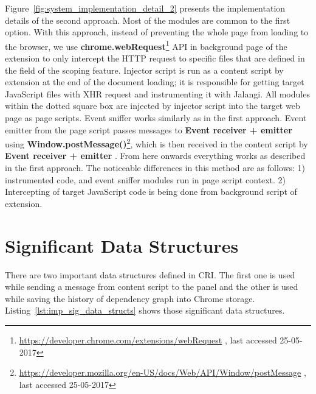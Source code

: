 Figure~\ref{fig:system_implementation_detail_2} presents the implementation details of the second approach. Most of the modules are common to the first option.
With this approach, instead of preventing the whole page from loading to the browser, we use \textbf{chrome.webRequest}\footnote{\url{https://developer.chrome.com/extensions/webRequest} , last accessed 25-05-2017} API in background page of the extension to only intercept the HTTP request to specific files that are defined in the field of the scoping feature.
Injector script is run as a content script by extension at the end of the document loading; it is responsible for getting target JavaScript files with XHR request and instrumenting it with Jalangi. 
All modules within the dotted square box are injected by injector script into the target web page as page scripts. Event sniffer works similarly as in the first approach.
Event emitter from the page script passes messages to \textbf{Event receiver + emitter} using \textbf{Window.postMessage()}\footnote{\url{https://developer.mozilla.org/en-US/docs/Web/API/Window/postMessage} , last accessed 25-05-2017}, which is then received in the content script by \textbf{Event receiver + emitter} .
From here onwards everything works as described in the first approach.
The noticeable differences in this method are as follows: 
1) instrumented code, and event sniffer modules run in page script context.
2) Intercepting of target JavaScript code is being done from background script of extension.




\section{Significant Data Structures}

There are two important data structures defined in CRI. The first one is used while sending a message from content script to the panel and the other is used while saving the history of dependency graph into Chrome storage. Listing~\ref{lst:imp_sig_data_structs} shows those significant data structures.

